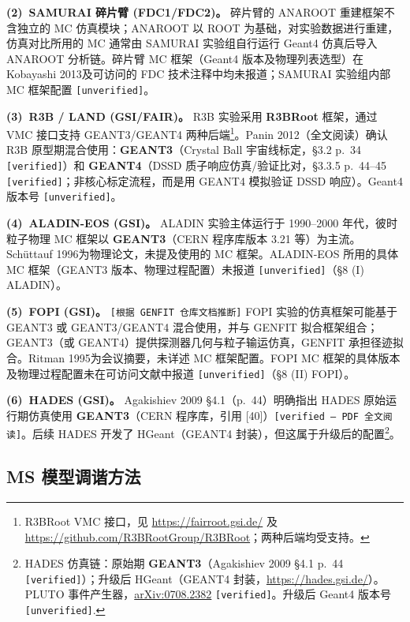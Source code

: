 \documentclass[a4paper, 11pt]{article}
\begin{document}
\textbf{(2)~SAMURAI 碎片臂 (FDC1/FDC2)。}
碎片臂的 ANAROOT 重建框架不含独立的 MC 仿真模块；ANAROOT 以 ROOT 为基础，对实验数据进行重建，仿真对比所用的 MC 通常由 SAMURAI 实验组自行运行 Geant4 仿真后导入 ANAROOT 分析链。碎片臂 MC 框架（Geant4 版本及物理列表选型）在 Kobayashi 2013及可访问的 FDC 技术注释中均未报道；SAMURAI 实验组内部 MC 框架配置 \texttt{[unverified]}。

\textbf{(3)~R3B / LAND (GSI/FAIR)。}
R3B 实验采用 \textbf{R3BRoot} 框架，通过 VMC 接口支持 GEANT3/GEANT4 两种后端\footnote{\label{fn:r3broot_vmc}R3BRoot VMC 接口，见 \url{https://fairroot.gsi.de/} 及 \url{https://github.com/R3BRootGroup/R3BRoot}；两种后端均受支持。}。Panin 2012（全文阅读）确认 R3B 原型期混合使用：\textbf{GEANT3}（Crystal Ball 宇宙线标定，§3.2 p.~34 \texttt{[verified]}）和 \textbf{GEANT4}（DSSD 质子响应仿真/验证比对，§3.3.5 p.~44--45 \texttt{[verified]}；非核心标定流程，而是用 GEANT4 模拟验证 DSSD 响应）。Geant4 版本号 \texttt{[unverified]}。

\textbf{(4)~ALADIN-EOS (GSI)。}
ALADIN 实验主体运行于 1990--2000 年代，彼时粒子物理 MC 框架以 \textbf{GEANT3}（CERN 程序库版本 3.21 等）为主流。Schüttauf 1996为物理论文，未提及使用的 MC 框架。ALADIN-EOS 所用的具体 MC 框架（GEANT3 版本、物理过程配置）未报道 \texttt{[unverified]}（§8 (I) ALADIN）。

\textbf{(5)~FOPI (GSI)。}
\texttt{[根据 GENFIT 仓库文档推断]} FOPI 实验的仿真框架可能基于 GEANT3 或 GEANT3/GEANT4 混合使用，并与 GENFIT 拟合框架组合；GEANT3（或 GEANT4）提供探测器几何与粒子输运仿真，GENFIT 承担径迹拟合。Ritman 1995为会议摘要，未详述 MC 框架配置。FOPI MC 框架的具体版本及物理过程配置未在可访问文献中报道 \texttt{[unverified]}（§8 (II) FOPI）。

\textbf{(6)~HADES (GSI)。}
Agakishiev 2009 §4.1（p.~44）明确指出 HADES 原始运行期仿真使用 \textbf{GEANT3}（CERN 程序库，引用 [40]）\texttt{[verified --- PDF 全文阅读]}。后续 HADES 开发了 HGeant（GEANT4 封装），但这属于升级后的配置\footnote{\label{fn:hades_sim}HADES 仿真链：原始期 \textbf{GEANT3}（Agakishiev 2009 §4.1 p.~44 \texttt{[verified]}）；升级后 HGeant（GEANT4 封装，\url{https://hades.gsi.de/}）。PLUTO 事件产生器，\href{https://arxiv.org/abs/0708.2382}{arXiv:0708.2382} \texttt{[verified]}。升级后 Geant4 版本号 \texttt{[unverified]}.}。

\subsection{MS 模型调谐方法}
\label{sec:ms_tuning}
\end{document}
